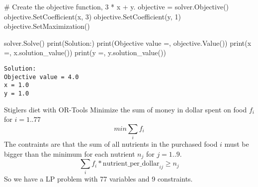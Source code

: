 \documentclass[
  ignorenonframetext,
]{beamer}
\newenvironment{Shaded}{\begin{snugshade}}{\end{snugshade}}
\newcommand{\BuiltInTok}[1]{\textcolor[rgb]{0.00,0.23,0.31}{#1}}
\newcommand{\CommentTok}[1]{\textcolor[rgb]{0.37,0.37,0.37}{#1}}
\newcommand{\DecValTok}[1]{\textcolor[rgb]{0.68,0.00,0.00}{#1}}
\newcommand{\NormalTok}[1]{\textcolor[rgb]{0.00,0.23,0.31}{#1}}
\newcommand{\OperatorTok}[1]{\textcolor[rgb]{0.37,0.37,0.37}{#1}}
\newcommand{\StringTok}[1]{\textcolor[rgb]{0.13,0.47,0.30}{#1}}
\begin{document}
\begin{frame}[fragile]
\begin{Shaded}
\begin{Highlighting}[]
\CommentTok{\# Create the objective function, 3 * x + y.}
\NormalTok{objective }\OperatorTok{=}\NormalTok{ solver.Objective()}
\NormalTok{objective.SetCoefficient(x, }\DecValTok{3}\NormalTok{)}
\NormalTok{objective.SetCoefficient(y, }\DecValTok{1}\NormalTok{)}
\NormalTok{objective.SetMaximization()}
\end{Highlighting}
\end{Shaded}

\pause

\begin{Shaded}
\begin{Highlighting}[]
\NormalTok{solver.Solve()}
\BuiltInTok{print}\NormalTok{(}\StringTok{\textquotesingle{}Solution:\textquotesingle{}}\NormalTok{)}
\BuiltInTok{print}\NormalTok{(}\StringTok{\textquotesingle{}Objective value =\textquotesingle{}}\NormalTok{, objective.Value())}
\BuiltInTok{print}\NormalTok{(}\StringTok{\textquotesingle{}x =\textquotesingle{}}\NormalTok{, x.solution\_value())}
\BuiltInTok{print}\NormalTok{(}\StringTok{\textquotesingle{}y =\textquotesingle{}}\NormalTok{, y.solution\_value())}
\end{Highlighting}
\end{Shaded}

\begin{verbatim}
Solution:
Objective value = 4.0
x = 1.0
y = 1.0
\end{verbatim}
\end{frame}

\begin{frame}{Stiglers diet with OR-Tools}
\protect\hypertarget{stiglers-diet-with-or-tools}{}
Minimize the sum of money in dollar spent on food \(f_i\) for
\(i=1..77\) \[
min \sum_i f_i 
\] The contraints are that the sum of all nutrients in the purchased
food \(i\) must be bigger than the minimum for each nutrient \(n_j\) for
\(j=1..9\). \[
\sum_i f_i * \text{nutrient_per_dollar}_{ij} \geq n_j
\] So we have a LP problem with 77 variables and 9 constraints.
\end{frame}
\end{document}
